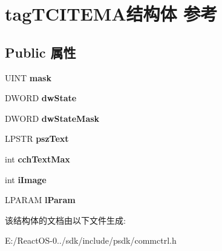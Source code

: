 \hypertarget{structtag_t_c_i_t_e_m_a}{}\section{tag\+T\+C\+I\+T\+E\+M\+A结构体 参考}
\label{structtag_t_c_i_t_e_m_a}
\subsection*{Public 属性}
\begin{DoxyCompactItemize}
\item 
\mbox{\label{structtag_t_c_i_t_e_m_a_ad9b1dfc09abca78a56d2ff6ad14ac079}} 
U\+I\+NT {\bfseries mask}
\item 
\mbox{\label{structtag_t_c_i_t_e_m_a_a9fd2107f9c7017cf6b784f24d8607a7a}} 
D\+W\+O\+RD {\bfseries dw\+State}
\item 
\mbox{\label{structtag_t_c_i_t_e_m_a_ad3c28a22d0307368aab131dccec6e2b4}} 
D\+W\+O\+RD {\bfseries dw\+State\+Mask}
\item 
\mbox{\label{structtag_t_c_i_t_e_m_a_abdf765d6bbb3880daf9fd1e205faf353}} 
L\+P\+S\+TR {\bfseries psz\+Text}
\item 
\mbox{\label{structtag_t_c_i_t_e_m_a_ad1a40065c2e44b117029b19ce3f2c3e0}} 
int {\bfseries cch\+Text\+Max}
\item 
\mbox{\label{structtag_t_c_i_t_e_m_a_ae91309d73ab634958414f2ab2f2fc075}} 
int {\bfseries i\+Image}
\item 
\mbox{\label{structtag_t_c_i_t_e_m_a_a2619e53c0f2b808ae3609f08bbcf34b3}} 
L\+P\+A\+R\+AM {\bfseries l\+Param}
\end{DoxyCompactItemize}


该结构体的文档由以下文件生成\+:\begin{DoxyCompactItemize}
\item 
E\+:/\+React\+O\+S-\/0../sdk/include/psdk/commctrl.\+h\end{DoxyCompactItemize}
